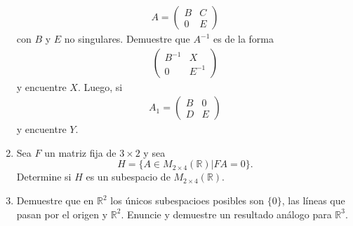 \documentclass[11pt,letterpaper]{article}
\newcommand{\mR}{\mathbb{R}}
\begin{document}
\begin{enumerate}
\begin{align*}
A=\begin{pmatrix}
B & C \\
0 & E
\end{pmatrix}
\end{align*}
con $B$ y $E$ no singulares. Demuestre que $A^{-1}$ es de la forma
\begin{align*}
\begin{pmatrix}
B^{-1}& X \\
0 & E^{-1}
\end{pmatrix}
\end{align*}
y encuentre $X$. Luego, si 
\begin{align*}
A_1=\begin{pmatrix}
B & 0 \\
D & E
\end{pmatrix}
\end{align*}
y encuentre $Y$.

\item Sea $F$ un matriz fija de $3\times 2$ y sea $$H=\{A\in M_{2\times 4}(\mathbb{R})|FA=0\}.$$
Determine si $H$ es un subespacio de $M_{2\times 4}(\mathbb{R})$.

\item Demuestre que en $\mR^2$ los únicos subespacioes posibles son $\{0\}$, las líneas que pasan por el origen y $\mR^2$. Enuncie y demuestre un resultado análogo para $\mR^3$.


\end{enumerate}
\end{document}
